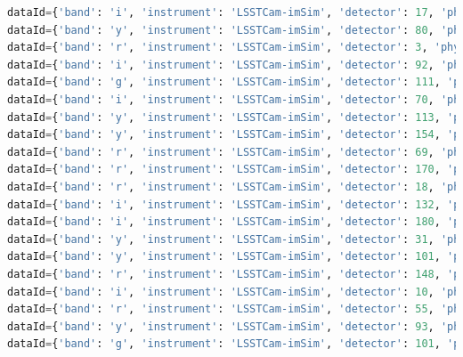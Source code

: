 \documentclass[DM,authoryear,toc]{lsstdoc}
\begin{document}
\begin{lstlisting}[language=Python, basicstyle=\tiny]
dataId={'band': 'i', 'instrument': 'LSSTCam-imSim', 'detector': 17, 'physical_filter': 'i_sim_1.4', 'visit': 1030664} records=None
dataId={'band': 'y', 'instrument': 'LSSTCam-imSim', 'detector': 80, 'physical_filter': 'y_sim_1.4', 'visit': 1032264} records=None
dataId={'band': 'r', 'instrument': 'LSSTCam-imSim', 'detector': 3, 'physical_filter': 'r_sim_1.4', 'visit': 1027069} records=None
dataId={'band': 'i', 'instrument': 'LSSTCam-imSim', 'detector': 92, 'physical_filter': 'i_sim_1.4', 'visit': 645659} records=None
dataId={'band': 'g', 'instrument': 'LSSTCam-imSim', 'detector': 111, 'physical_filter': 'g_sim_1.4', 'visit': 1039916} records=None
dataId={'band': 'i', 'instrument': 'LSSTCam-imSim', 'detector': 70, 'physical_filter': 'i_sim_1.4', 'visit': 1029805} records=None
dataId={'band': 'y', 'instrument': 'LSSTCam-imSim', 'detector': 113, 'physical_filter': 'y_sim_1.4', 'visit': 1032265} records=None
dataId={'band': 'y', 'instrument': 'LSSTCam-imSim', 'detector': 154, 'physical_filter': 'y_sim_1.4', 'visit': 646755} records=None
dataId={'band': 'r', 'instrument': 'LSSTCam-imSim', 'detector': 69, 'physical_filter': 'r_sim_1.4', 'visit': 1006099} records=None
dataId={'band': 'r', 'instrument': 'LSSTCam-imSim', 'detector': 170, 'physical_filter': 'r_sim_1.4', 'visit': 1038217} records=None
dataId={'band': 'r', 'instrument': 'LSSTCam-imSim', 'detector': 18, 'physical_filter': 'r_sim_1.4', 'visit': 1049334} records=None
dataId={'band': 'i', 'instrument': 'LSSTCam-imSim', 'detector': 132, 'physical_filter': 'i_sim_1.4', 'visit': 645659} records=None
dataId={'band': 'i', 'instrument': 'LSSTCam-imSim', 'detector': 180, 'physical_filter': 'i_sim_1.4', 'visit': 1030665} records=None
dataId={'band': 'y', 'instrument': 'LSSTCam-imSim', 'detector': 31, 'physical_filter': 'y_sim_1.4', 'visit': 1032264} records=None
dataId={'band': 'y', 'instrument': 'LSSTCam-imSim', 'detector': 101, 'physical_filter': 'y_sim_1.4', 'visit': 1012178} records=None
dataId={'band': 'r', 'instrument': 'LSSTCam-imSim', 'detector': 148, 'physical_filter': 'r_sim_1.4', 'visit': 1049335} records=None
dataId={'band': 'i', 'instrument': 'LSSTCam-imSim', 'detector': 10, 'physical_filter': 'i_sim_1.4', 'visit': 1013734} records=None
dataId={'band': 'r', 'instrument': 'LSSTCam-imSim', 'detector': 55, 'physical_filter': 'r_sim_1.4', 'visit': 1038222} records=None
dataId={'band': 'y', 'instrument': 'LSSTCam-imSim', 'detector': 93, 'physical_filter': 'y_sim_1.4', 'visit': 1032264} records=None
dataId={'band': 'g', 'instrument': 'LSSTCam-imSim', 'detector': 101, 'physical_filter': 'g_sim_1.4', 'visit': 1039916} records=None

\end{lstlisting}
\end{document}
